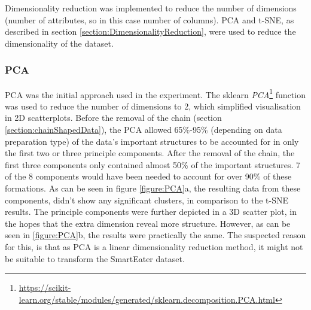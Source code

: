 
Dimensionality reduction was implemented to reduce the number of dimensions (number of attributes, so in this case number of columns). PCA and t-SNE, as described in section \ref{section:DimensionalityReduction}, were used to reduce the dimensionality of the dataset. 

\subsubsection{PCA}
PCA was the initial approach used in the experiment. The sklearn \textit{PCA}\footnote{\url{https://scikit-learn.org/stable/modules/generated/sklearn.decomposition.PCA.html}} function was used to reduce the number of dimensions to 2, which simplified visualisation in 2D scatterplots. Before the removal of the chain (section \ref{section:chainShapedData}), the PCA allowed 65\%-95\% (depending on data preparation type) of the data's important structures to be accounted for in only the first two or three principle components. After the removal of the chain, the first three components only contained almost 50\% of the important structures. 7 of the 8 components would have been needed to account for over 90\% of these formations. As can be seen in figure \ref{figure:PCA}a, the resulting data from these components, didn't show any significant clusters, in comparison to the t-SNE results. The principle components were further depicted in a 3D scatter plot, in the hopes that the extra dimension reveal more structure. However, as can be seen in \ref{figure:PCA}b, the results were practically the same. The suspected reason for this, is that as PCA is a linear dimensionality reduction method, it might not be suitable to transform the SmartEater dataset.



